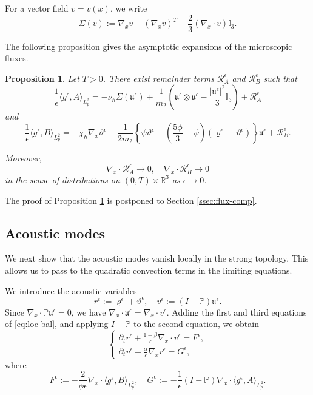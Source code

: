 \documentclass[10pt,reqno]{amsart}
\numberwithin{equation}{section}
\newtheorem{proposition}{Proposition}[section]
\newcommand{\lt}{\left}
\newcommand{\rt}{\right}
\newcommand{\lal}{\langle}
\newcommand{\ral}{\rangle}
\newcommand{\mP}{\mathbb{P}}
\newcommand{\vrh}{\varrho}
\newcommand{\vth}{\vartheta}
\newcommand{\mfu}{\mathfrak{u}}
\newcommand{\R}{\mathbb R}
\newcommand{\bq}{\begin{equation}}
\newcommand{\eq}{\end{equation}}
\newcommand{\pa}{\partial}
\newcommand{\calR}{\mathcal R}
\begin{document}
For a vector field $v=v(x)$, we write
\[
\Sigma(v):=\nabla_xv+(\nabla_xv)^T-\frac{2}{3}(\nabla_x\cdot v)\mathbb I_3.
\]

The following proposition gives the asymptotic expansions of the microscopic fluxes.

\begin{proposition}\label{prop:flux}
Let $T>0$. There exist remainder terms $\calR_A^\epsilon$ and $\calR_B^\epsilon$ such that
\bq\label{eq:A-exp}
\frac{1}{\epsilon}\lal g^\epsilon,A \ral_{L^2_p}=-\nu_\hbar\Sigma(\mfu^\epsilon)+\frac{1}{m_2 }\lt(\mfu^\epsilon\otimes\mfu^\epsilon-\frac{|\mfu^\epsilon|^2}{3}\mathbb I_3\rt)+\calR_A^\epsilon
\eq
and
\bq\label{eq:B-exp}
\frac{1}{\epsilon}\lal g^\epsilon,B \ral_{L^2_p} = -\chi_\hbar\nabla_x\vth^\epsilon + \frac{1}{2m_2 } \lt\{ \psi \vth^\epsilon + \lt(\frac{5\phi }{3}-\psi \rt) \lt( \vrh^\epsilon+\vth^\epsilon \rt) \rt\} \mfu^\epsilon + \calR_B^\epsilon.
\eq

 
Moreover,
\bq\label{eq:R-flux}
\nabla_x\cdot\calR_A^\epsilon\to0, \quad \nabla_x\cdot\calR_B^\epsilon\to0
\eq
in the sense of distributions on $(0,T)\times\R^3$ as $\epsilon\to0$.
\end{proposition}
 The proof of Proposition \ref{prop:flux} is postponed to Section \ref{ssec:flux-comp}.

%
%
%
%
%
%
%
%
%
%
\subsection{Acoustic modes}

We next show that the acoustic modes vanish locally in the strong topology. This allows us to pass to the quadratic convection terms in the limiting equations.

We introduce the acoustic variables
\[
r^\epsilon:=\vrh^\epsilon+\vth^\epsilon, \quad v^\epsilon:=(I-\mP)\mfu^\epsilon.
\]
Since $\nabla_x\cdot\mP\mfu^\epsilon=0$, we have $\nabla_x\cdot\mfu^\epsilon=\nabla_x\cdot v^\epsilon$.  Adding the first and third equations of \eqref{eq:loc-bal}, and applying $I-\mP$ to the second equation, we obtain
\bq\label{eq:ac-sys}
\begin{cases}
\displaystyle \pa_t r^\epsilon + \frac{1+\beta}{\epsilon} \nabla_x\cdot v^\epsilon = F^\epsilon, \\[2mm] 
\displaystyle \pa_t v^\epsilon + \frac{\alpha}{\epsilon} \nabla_x r^\epsilon = G^\epsilon,
\end{cases}
\eq
where
\[
F^\epsilon := -\frac{2}{\phi\epsilon} \nabla_x\cdot \lal g^\epsilon, B \ral_{L^2_p},  \quad  G^\epsilon := -\frac{1}{\epsilon} (I-\mP) \nabla_x\cdot \lal g^\epsilon, A \ral_{L^2_p}.
\]
\end{document}
